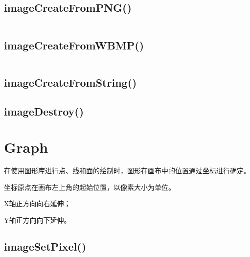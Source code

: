 \begin{lstlisting}[language=PHP]

\end{lstlisting}


\subsection{imageCreateFromPNG()}


\begin{lstlisting}[language=PHP]

\end{lstlisting}



\subsection{imageCreateFromWBMP()}




\begin{lstlisting}[language=PHP]

\end{lstlisting}

\subsection{imageCreateFromString()}



\subsection{imageDestroy()}


\section{Graph}



在使用图形库进行点、线和面的绘制时，图形在画布中的位置通过坐标进行确定。


\begin{compactitem}
\item 坐标原点在画布左上角的起始位置，以像素大小为单位。
\item X轴正方向向右延伸；
\item Y轴正方向向下延伸。
\end{compactitem}

\subsection{imageSetPixel()}



